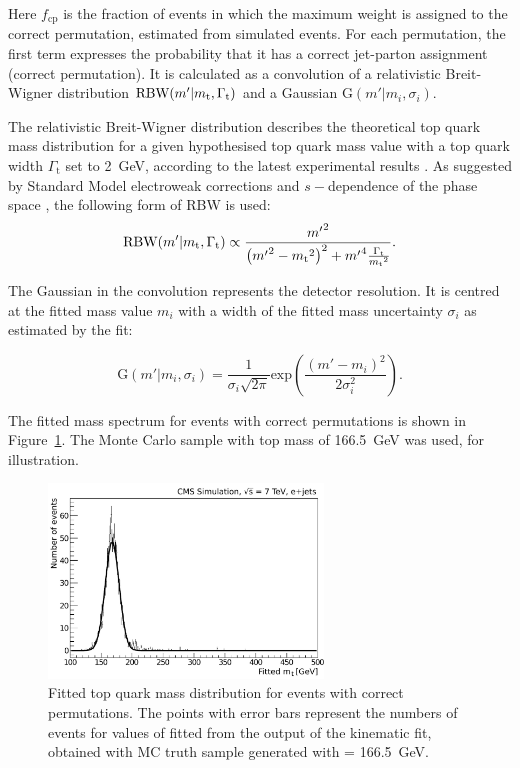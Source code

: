 Here $f_{\textrm{cp}}$ is the fraction of events in which the maximum weight is assigned to the correct permutation,
estimated from simulated \ttbar events. For each permutation, the first term expresses the probability that it has a
correct jet-parton assignment (correct permutation). It is calculated as a convolution of a relativistic Breit-Wigner
distribution $\textrm{RBW}(m'|m_\mathrm{t},\Gamma_{\textrm{t}})$ and a Gaussian $\textrm{G}(m'|m_{i},\sigma_{i})$.

The relativistic Breit-Wigner distribution describes the theoretical top quark mass distribution for a given
hypothesised top quark mass value \mtop with a top quark width $\Gamma_{\textrm{t}}$ set to \SI{2}{\GeV}, according to
the latest experimental results \autocite{top_width_D0}. As suggested by Standard Model electroweak corrections and
$s-$dependence of the phase space \cite{aleph_Z_RBW}, the following form of RBW is used:
\begin{equation}
\textrm{RBW}(m'|m_\mathrm{t},\Gamma_{\textrm{t}}) \propto \frac{{m'}^{2}}{\left({m'}^{2} - {m_\mathrm{t}}^{2}
\right)^{2} + {m'}^{4}\frac{\Gamma_{\textrm{t}}}{{m_\mathrm{t}}^{2}}}.
\end{equation}

The Gaussian in the convolution represents the detector resolution. It is centred at the fitted mass value $m_{i}$ with
a width of the fitted mass uncertainty $\sigma_{i}$ as estimated by the fit:

\begin{equation}
\textrm{G}(m'|m_{i},\sigma_{i}) = \frac{1}{\sigma_{i}\sqrt{2\pi}}
\textrm{exp}\left(\frac{(m'-m_{i})^{2}}{2\sigma_{i}^2}\right).
\end{equation}

The fitted mass spectrum for \ttbar events with correct permutations is shown in
Figure~\ref{fig:fitted_ttbar_cp_density}. The Monte Carlo sample with top mass of \SI{166.5}{\GeV} was used, for
illustration.

\begin{figure}[!htpb]
	\centering
    \includegraphics[width=0.65\textwidth]{correct_permutations_fitted_top_mass}
	\caption[Fitted top quark mass distribution for \ttbar events with correct permutations]{Fitted top quark mass
	distribution for \ttbar events with correct permutations. The points with error bars represent the numbers of events
	for values of fitted \mtop from the output of the kinematic fit, obtained with MC truth sample generated with \mtop
	= \SI{166.5}{\GeV}.}
	\label{fig:fitted_ttbar_cp_density}
\end{figure}

